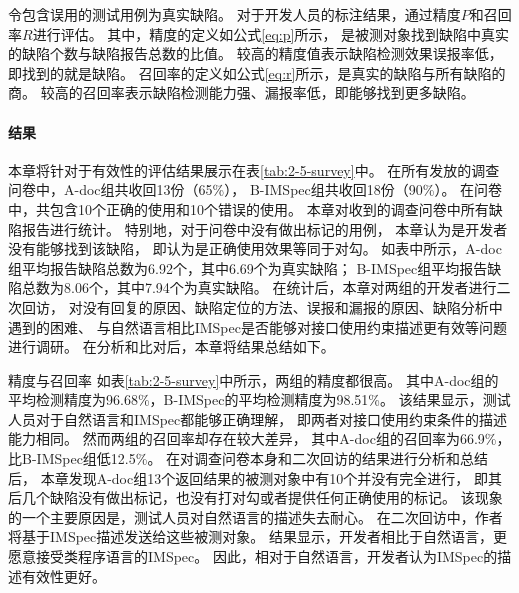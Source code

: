 令包含误用的测试用例为真实缺陷。
对于开发人员的标注结果，通过精度$P$和召回率$R$进行评估。
其中，精度的定义如公式\ref{eq:p}所示，
是被测对象找到缺陷中真实的缺陷个数与缺陷报告总数的比值。
较高的精度值表示缺陷检测效果误报率低，即找到的就是缺陷。
召回率的定义如公式\ref{eq:r}所示，是真实的缺陷与所有缺陷的商。
较高的召回率表示缺陷检测能力强、漏报率低，即能够找到更多缺陷。




\paragraph{结果}
本章将针对于有效性的评估结果展示在表\ref{tab:2-5-survey}中。
在所有发放的调查问卷中，A-doc组共收回13份（65\%），
B-IMSpec组共收回18份（90\%）。
在问卷中，共包含10个正确的使用和10个错误的使用。
本章对收到的调查问卷中所有缺陷报告进行统计。
特别地，对于问卷中没有做出标记的用例，
本章认为是开发者没有能够找到该缺陷，
即认为是正确使用效果等同于对勾。
如表中所示，A-doc组平均报告缺陷总数为6.92个，其中6.69个为真实缺陷；
B-IMSpec组平均报告缺陷总数为8.06个，其中7.94个为真实缺陷。
在统计后，本章对两组的开发者进行二次回访，
对没有回复的原因、缺陷定位的方法、误报和漏报的原因、缺陷分析中遇到的困难、
与自然语言相比IMSpec是否能够对接口使用约束描述更有效等问题进行调研。
在分析和比对后，本章将结果总结如下。

{\kaishu 精度与召回率 }
如表\ref{tab:2-5-survey}中所示，两组的精度都很高。
其中A-doc组的平均检测精度为96.68\%，B-IMSpec的平均检测精度为98.51\%。
该结果显示，测试人员对于自然语言和IMSpec都能够正确理解，
即两者对接口使用约束条件的描述能力相同。
然而两组的召回率却存在较大差异，
其中A-doc组的召回率为66.9\%，比B-IMSpec组低12.5\%。
在对调查问卷本身和二次回访的结果进行分析和总结后，
本章发现A-doc组13个返回结果的被测对象中有10个并没有完全进行，
即其后几个缺陷没有做出标记，也没有打对勾或者提供任何正确使用的标记。
该现象的一个主要原因是，测试人员对自然语言的描述失去耐心。
在二次回访中，作者将基于IMSpec描述发送给这些被测对象。
结果显示，开发者相比于自然语言，更愿意接受类程序语言的IMSpec。
因此，相对于自然语言，开发者认为IMSpec的描述有效性更好。
	
